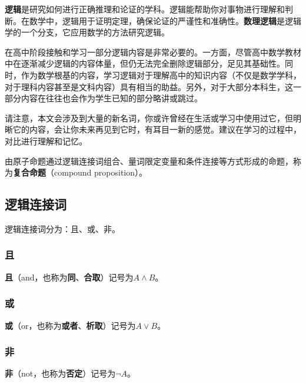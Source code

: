 
\begin{issues}
\issueDraft
\end{issues}


\textbf{逻辑}是研究如何进行正确推理和论证的学科。逻辑能帮助你对事物进行理解和判断。在数学中，逻辑用于证明定理，确保论证的严谨性和准确性。\textbf{数理逻辑}是逻辑学的一个分支，它应用数学的方法研究逻辑。

在高中阶段接触和学习一部分逻辑内容是非常必要的。一方面，尽管高中数学教材中在逐渐减少逻辑的内容体量，但仍无法完全删除逻辑部分，足见其基础性。同时，作为数学根基的内容，学习逻辑对于理解高中的知识内容（不仅是数学学科，对于理科内容甚至是文科内容）具有相当的助益。另外，对于大部分本科生，这一部分内容在往往也会作为学生已知的部分略讲或跳过。

请注意，本文会涉及到大量的新名词，你或许曾经在生活或学习中使用过它，但明晰它的内容，会让你未来再见到它时，有耳目一新的感觉。建议在学习的过程中，对比进行理解和记忆。


由原子命题通过逻辑连接词组合、量词限定变量和条件连接等方式形成的命题，称为\textbf{复合命题}（compound proposition）。

\subsection{逻辑连接词}

逻辑连接词分为：且、或、非。

\subsubsection{且}

\textbf{且}（and，也称为\textbf{同}、\textbf{合取}）记号为$A\land B$。

\subsubsection{或}

\textbf{或}（or，也称为\textbf{或者}、\textbf{析取}）记号为$A\lor B$。

\subsubsection{非}

\textbf{非}（not，也称为\textbf{否定}）记号为$\lnot A$。

